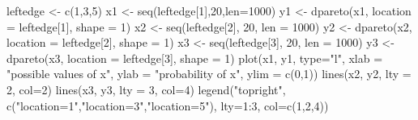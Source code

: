 \begin{Schunk}
\begin{Sinput}
 leftedge <- c(1,3,5)
 x1 <- seq(leftedge[1],20,len=1000)
 y1 <- dpareto(x1, location = leftedge[1], shape = 1)
 x2 <- seq(leftedge[2], 20, len = 1000)
 y2 <- dpareto(x2, location = leftedge[2], shape = 1)
 x3 <- seq(leftedge[3], 20, len = 1000)
 y3 <- dpareto(x3, location = leftedge[3], shape = 1)
 plot(x1, y1, type="l", xlab = "possible values of x", ylab = "probability of x", ylim = c(0,1))
 lines(x2, y2, lty = 2, col=2)
 lines(x3, y3, lty = 3, col=4)
 legend("topright", c("location=1","location=3","location=5"), lty=1:3, col=c(1,2,4))
\end{Sinput}
\end{Schunk}
